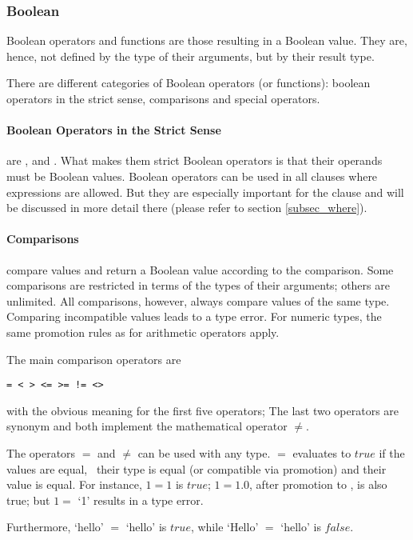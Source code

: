 \subsubsection{Boolean}
Boolean operators and functions
are those resulting in a Boolean value.
They are, hence, not defined by the type
of their arguments, but by their result type.

There are different categories of Boolean
operators (or functions):
boolean operators in the strict sense,
comparisons and special operators.

\paragraph{Boolean Operators in the Strict Sense}
are ,  and .
What makes them strict Boolean operators is
that their operands must be Boolean values.
Boolean operators can be used in all clauses
where expressions are allowed.
But they are especially important for the
 clause and will be discussed
in more detail there (please refer to section
\ref{subsec_where}).

\paragraph{Comparisons}
compare values and return
a Boolean value according to the comparison.
Some comparisons are restricted in terms
of the types of their arguments;
others are unlimited. All comparisons, however,
always compare values of the same type.
Comparing incompatible values leads to a type error.
For numeric types, the same promotion rules
as for arithmetic operators apply.

The main comparison operators are
\begin{verbatim}
= < > <= >= != <>
\end{verbatim}
with the obvious meaning for
the first five operators;
The last two operators
are synonym and both implement
the mathematical operator $\neq$.

The operators $=$ and $\neq$ can be used
with any type. $=$ evaluates to $true$
if the values are equal, \ie\
their type is equal (or compatible
via promotion) and their value
is equal. For instance,
$1 = 1$ is $true$;
$1 = 1.0$, after promotion to ,
is also true; but
$1 =$ `1' results in a type error.

Furthermore, `hello' $=$ `hello'
is $true$, while `Hello' $=$ `hello'
is $false$.

